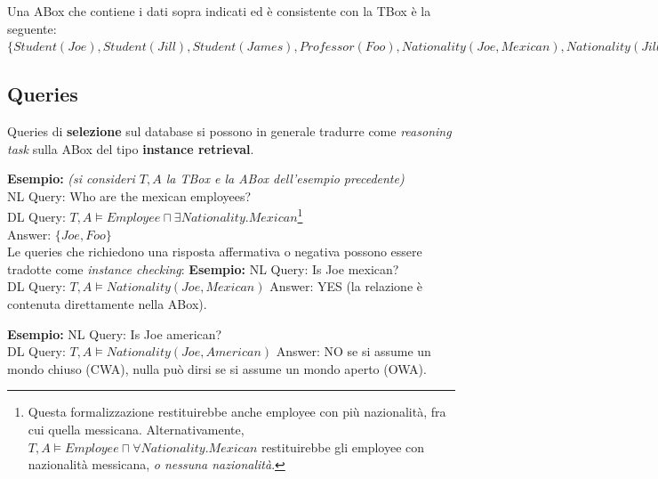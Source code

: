 Una ABox che contiene i dati sopra indicati ed è consistente con la TBox è la seguente: $\big\{ Student(Joe), Student(Jill), Student(James), Professor(Foo),\allowbreak Nationality(Joe, Mexican), Nationality(Jill, American),\allowbreak Nationality(James, Canadian),\allowbreak Nationality(Foo, Mexican),\allowbreak Supervise(Foo, Joe), Supervise(Foo, Jill) \big\}$

\subsection{Queries}

Queries di \textbf{selezione} sul database si possono in generale tradurre come \textit{reasoning task} sulla ABox del tipo \textbf{instance retrieval}.

\textbf{Esempio:} \textit{(si consideri $T, A$ la TBox e la ABox dell'esempio precedente)}\\
NL Query: Who are the mexican employees?\\
DL Query: $T, A \models Employee \sqcap \exists Nationality.Mexican$\footnote{Questa formalizzazione restituirebbe anche employee con più nazionalità, fra cui quella messicana. Alternativamente, $T, A \models Employee \sqcap \forall Nationality.Mexican$ restituirebbe gli employee con nazionalità messicana, \textit{o nessuna nazionalità}.}\\
Answer: $\{Joe, Foo\}$
\\

Le queries che richiedono una risposta affermativa o negativa possono essere tradotte come \textit{instance checking}:
\textbf{Esempio:}
NL Query: Is Joe mexican?\\
DL Query: $T, A \models Nationality(Joe, Mexican)$
Answer: YES (la relazione è contenuta direttamente nella ABox).

\textbf{Esempio:}
NL Query: Is Joe american?\\
DL Query: $T, A \models Nationality(Joe, American)$
Answer: NO se si assume un mondo chiuso (CWA), nulla può dirsi se si assume un mondo aperto (OWA).


